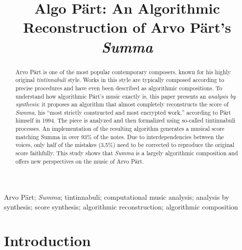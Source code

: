 \documentclass{interact}
\begin{document}


\title{%
    Algo Pärt: An Algorithmic Reconstruction of Arvo Pärt's \emph{Summa}}

\author{
}


\maketitle


\begin{abstract}
    Arvo Pärt is one of the most popular contemporary composers, known for his highly original \emph{tintinnabuli} style. 
    Works in this style are typically composed according to precise procedures and have even been described as algorithmic compositions. 
    To understand how algorithmic Pärt’s music exactly is, this paper presents an \emph{analysis by synthesis}: it proposes an algorithm that almost completely reconstructs the score of \emph{Summa}, his “most strictly constructed and most encrypted work,” according to Pärt himself in 1994. 
    The piece is analyzed and then formalized using so-called tintinnabuli processes.
    An implementation of the resulting algorithm generates a musical score matching Summa in over 93\% of the notes. 
    Due to interdependencies between the voices, only half of the mistakes (3,5\%) need to be corrected to reproduce the original score faithfully. 
    This study shows that \emph{Summa} is a largely algorithmic composition and offers new perspectives on the music of Arvo Pärt.
\end{abstract}

\begin{keywords}
Arvo Pärt; \emph{Summa}; tintinnabuli; computational music analysis; analysis by synthesis; score synthesis; algorithmic reconstruction; algorithmic composition
\end{keywords}



\section{Introduction}
\end{document}
